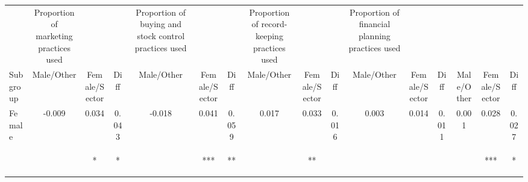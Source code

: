 \begin{tabular}{lccccccccccccccc}
\hline \noalign{\smallskip} & Proportion of marketing practices used &  &  & Proportion of buying and stock control practices used &  &  & Proportion of record-keeping practices used &  &  & Proportion of financial planning practices used &  &  &  &  & \\
Subgroup & Male/Other & Female/Sector & Diff & Male/Other & Female/Sector & Diff & Male/Other & Female/Sector & Diff & Male/Other & Female/Sector & Diff & Male/Other & Female/Sector & Diff\\
\noalign{\smallskip}\hline \noalign{\smallskip}Female & -0.009 & 0.034 & 0.043 & -0.018 & 0.041 & 0.059 & 0.017 & 0.033 & 0.016 & 0.003 & 0.014 & 0.011 & 0.001 & 0.028 & 0.027\\
 & \begin{footnotesize}[0.019]\end{footnotesize} & \begin{footnotesize}[0.019]*\end{footnotesize} & \begin{footnotesize}[0.024]*\end{footnotesize} & \begin{footnotesize}[0.019]\end{footnotesize} & \begin{footnotesize}[0.015]***\end{footnotesize} & \begin{footnotesize}[0.023]**\end{footnotesize} & \begin{footnotesize}[0.020]\end{footnotesize} & \begin{footnotesize}[0.016]**\end{footnotesize} & \begin{footnotesize}[0.026]\end{footnotesize} & \begin{footnotesize}[0.014]\end{footnotesize} & \begin{footnotesize}[0.011]\end{footnotesize} & \begin{footnotesize}[0.017]\end{footnotesize} & \begin{footnotesize}[0.011]\end{footnotesize} & \begin{footnotesize}[0.010]***\end{footnotesize} & \begin{footnotesize}[0.014]*\end{footnotesize}\\

\end{tabular}
